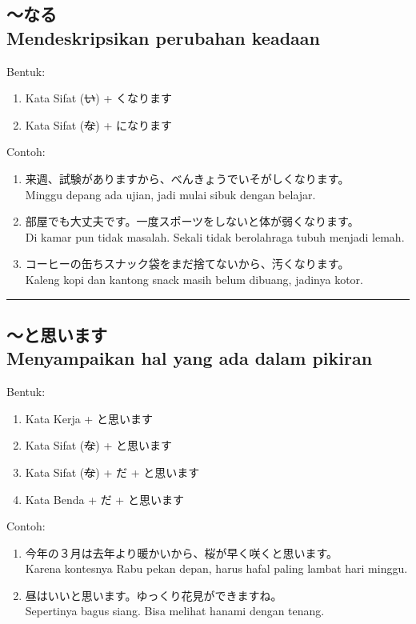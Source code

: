 \subsection*{
    ～なる \\
    Mendeskripsikan perubahan keadaan
}
Bentuk:
\begin{enumerate}
    \item Kata Sifat (\sout{い}) + くなります
    \item Kata Sifat (\sout{な}) + になります
\end{enumerate}
Contoh: 
\begin{enumerate}
    \item 来週、試験がありますから、べんきょうでいそがしくなります。
    \\ Minggu depang ada ujian, jadi mulai sibuk dengan belajar.
    \item 部屋でも大丈夫です。一度スポーツをしないと体が弱くなります。
    \\ Di kamar pun tidak masalah. Sekali tidak berolahraga tubuh menjadi lemah.
    \item コーヒーの缶ちスナック袋をまだ捨てないから、汚くなります。
    \\ Kaleng kopi dan kantong snack masih belum dibuang, jadinya kotor.
\end{enumerate}

\vspace{0.2cm}\hrule height 1pt\vspace{0.2cm}

\newpage
\subsection*{
    ～と思います \\
    Menyampaikan hal yang ada dalam pikiran
}
Bentuk:
\begin{enumerate}
    \item Kata Kerja + と思います
    \item Kata Sifat (\sout{な}) + と思います
    \item Kata Sifat (\sout{な}) + だ + と思います
    \item Kata Benda + だ + と思います
\end{enumerate}
Contoh: 
\begin{enumerate}
    \item 今年の３月は去年より暖かいから、桜が早く咲くと思います。
    \\ Karena kontesnya Rabu pekan depan, harus hafal paling lambat hari minggu.
    \item 昼はいいと思います。ゆっくり花見ができますね。
    \\ Sepertinya bagus siang. Bisa melihat hanami dengan tenang.
\end{enumerate}

